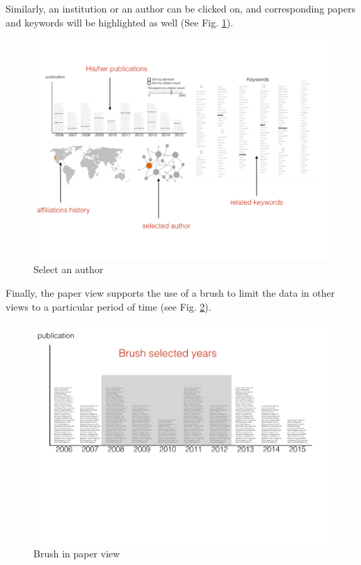 \documentclass[12pt]{article}
\begin{document}
Similarly, an institution or an author can be clicked on, and corresponding papers and keywords will be highlighted as well (See Fig. \ref{fig:select_author}).

\begin{figure}[htb!]
    \centering
    \includegraphics[width=160mm]{visproposalDrawing_page_Part_5.pdf}
    \caption{Select an author}
    \label{fig:select_author}
\end{figure}

Finally, the paper view supports the use of a brush to limit the data in other views to a particular period of time (see Fig. \ref{fig:brush}).

\begin{figure}[htb!]
    \centering
    \includegraphics[width=160mm]{visproposalDrawing_page_Part_7.pdf}
    \caption{Brush in paper view}
    \label{fig:brush}
\end{figure}
\end{document}
